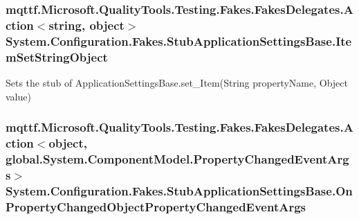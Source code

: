 \hypertarget{class_system_1_1_configuration_1_1_fakes_1_1_stub_application_settings_base_a6901a7dd314c4ddcb2c8aa043847088d}{
\subsubsection[{Item\-Set\-String\-Object}]{\setlength{\rightskip}{0pt plus 5cm}mqttf.\-Microsoft.\-Quality\-Tools.\-Testing.\-Fakes.\-Fakes\-Delegates.\-Action$<$string, object$>$ System.\-Configuration.\-Fakes.\-Stub\-Application\-Settings\-Base.\-Item\-Set\-String\-Object}}\label{class_system_1_1_configuration_1_1_fakes_1_1_stub_application_settings_base_a6901a7dd314c4ddcb2c8aa043847088d}


Sets the stub of Application\-Settings\-Base.\-set\-\_\-\-Item(\-String property\-Name, Object value)

\hypertarget{class_system_1_1_configuration_1_1_fakes_1_1_stub_application_settings_base_a79810767abd2f697e09551329e8d1b80}{
\subsubsection[{On\-Property\-Changed\-Object\-Property\-Changed\-Event\-Args}]{\setlength{\rightskip}{0pt plus 5cm}mqttf.\-Microsoft.\-Quality\-Tools.\-Testing.\-Fakes.\-Fakes\-Delegates.\-Action$<$object, global.\-System.\-Component\-Model.\-Property\-Changed\-Event\-Args$>$ System.\-Configuration.\-Fakes.\-Stub\-Application\-Settings\-Base.\-On\-Property\-Changed\-Object\-Property\-Changed\-Event\-Args}}\label{class_system_1_1_configuration_1_1_fakes_1_1_stub_application_settings_base_a79810767abd2f697e09551329e8d1b80}


